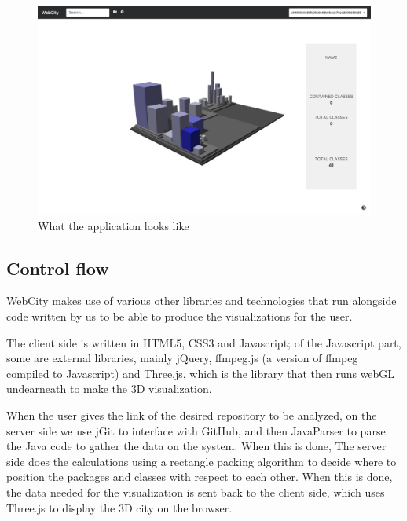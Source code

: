 \documentclass[]{usiinfbachelorproject}
\begin{document}
\begin{figure} [H]
\centering
\includegraphics[width=1\textwidth]{pictures/app.png}
\caption{What the application looks like}
\label{fig:app}
\end{figure}

\subsection{Control flow} \label{Control flow}
WebCity makes use of various other libraries and technologies that run alongside code written by us to be able to produce the visualizations for the user.

The client side is written in HTML5, CSS3 and Javascript; of the Javascript part, some are external libraries, mainly jQuery, ffmpeg.js (a version of ffmpeg compiled to Javascript) and Three.js, which is the library that then runs webGL undearneath to make the 3D visualization.

When the user gives the link of the desired repository to be analyzed, on the server side we use jGit to interface with GitHub, and then JavaParser to parse the Java code to gather the data on the system. When this is done, The server side does the calculations using a rectangle packing algorithm to decide where to position the packages and classes with respect to each other. When this is done, the data needed for the visualization is sent back to the client side, which uses Three.js to display the 3D city on the browser.
\end{document}
